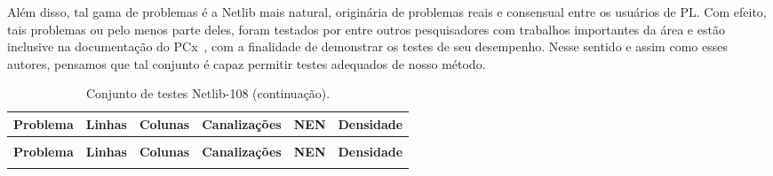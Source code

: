 Além disso, tal gama de problemas é a Netlib mais natural, originária de problemas reais e consensual entre os usuários de \ac{PL}. Com efeito, tais problemas ou pelo menos parte deles, foram testados por \textcite{Mehrotra:1992wr,Colombo:2008ia,Mehrotra:2005do,Jarre:1999tl,Gondzio:1996uw} entre outros pesquisadores com trabalhos importantes da área e estão inclusive na documentação do PCx~\cite{Czyzyk:1998vw,Czyzyk:1999hk}, com a finalidade de demonstrar os testes de seu desempenho. Nesse sentido e assim como esses autores, pensamos que tal conjunto é capaz permitir testes adequados de nosso método. 


{\footnotesize \onehalfspacing



\begin{longtable}{>{\ttfamily}lrrrrc}

\caption{\normalfont Conjunto de testes Netlib-108.\label{tab:netlib108}} \\
\toprule
 \textbf{\sffamily Problema}                  & \textbf{\sffamily Linhas} & \textbf{\sffamily Colunas} & \textbf{\sffamily Canalizações} & \textbf{\sffamily NEN} & \textbf{\sffamily Densidade}    \\
\midrule
\endfirsthead


\caption[]{\normalfont Conjunto de testes Netlib-108 (continuação).} \\

\toprule
 \textbf{\sffamily Problema}                  & \textbf{\sffamily Linhas} & \textbf{\sffamily Colunas} & \textbf{\sffamily Canalizações} & \textbf{\sffamily NEN} & \textbf{\sffamily Densidade}    \\
\midrule
\endhead


\bottomrule

\endlastfoot


\end{longtable}}
